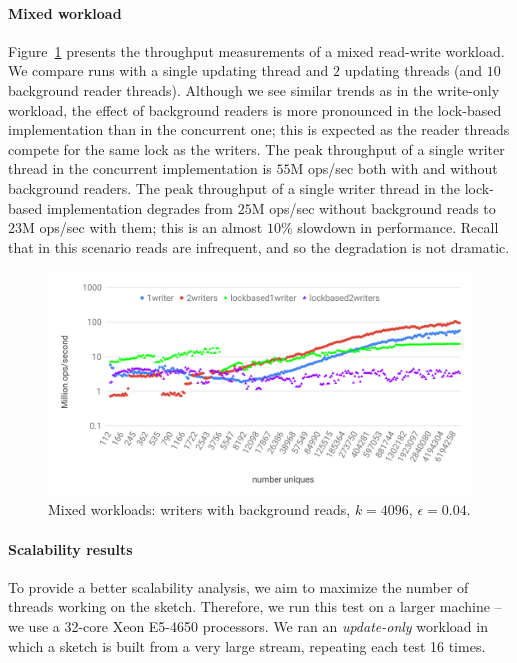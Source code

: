 \paragraph{Mixed workload}
Figure~\ref{fc-fig:mixed-throughput} presents the throughput measurements
of a mixed read-write workload. We compare runs with a single updating thread and $2$
updating threads (and $10$ background reader threads).
Although we see similar trends as in the write-only workload, the effect of
background readers is more pronounced in the lock-based implementation than in the concurrent one;
this is expected as the reader threads compete for the same lock as the writers.
The peak throughput of a single writer thread in the concurrent implementation is $55$M ops/sec both with and
without background readers. The peak throughput of a single writer thread in the lock-based
implementation degrades from $25$M ops/sec without background reads to $23$M ops/sec with them; this is an almost $10$\% slowdown in performance.
Recall that in this scenario reads are infrequent, and so the degradation is not dramatic.

\begin{figure}[tb]
\setlength{\abovecaptionskip}{0pt}
\setlength{\belowcaptionskip}{0pt}
\setlength\textfloatsep{0pt}
	\centering
	\includegraphics[width=\columnwidth]{graphics/fast-concurrent/theta-mixed.pdf}
	\caption{{Mixed workloads: writers with background reads, $k = 4096$, $\epsilon=0.04$.}}
	\label{fc-fig:mixed-throughput}
\end{figure}


\paragraph{Scalability results}
To provide a better scalability analysis, we aim to maximize the number of threads working on the
sketch. Therefore, we run this test on a larger machine -- we use a 32-core Xeon E5-4650 processors.
We ran an \emph{update-only} workload in which a sketch is built from a very large stream, repeating
each test 16 times.


